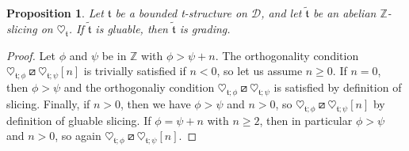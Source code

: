 \documentclass{article}
\newtheorem{prop}[thm]{Proposition}
\newtheorem{lem}[thm]{Lemma}
\theoremstyle{definition}
\newcommand{\Z}{\mathbb{Z}}
\newcommand{\tee}{\mathfrak{t}}
\newcommand{\orth}{\boxslash}
\begin{document}
\begin{prop}\label{glue-to-grad}
Let $\mathfrak{t}$ be a bounded t-structure on $\mathscr{D}$, and let $\tilde{\tee}$ be an abelian $\mathbb{Z}$-slicing on $\heartsuit_{\mathfrak{t}}$. If $\tilde{\tee}$ is gluable, then $\tilde{\tee}$ is grading.
\end{prop}
\begin{proof}
Let $\phi$ and $\psi$ be in $\Z$ with $\phi>\psi+n$.
The orthogonality condition $\heartsuit_{\tee;\phi}\orth\heartsuit_{\tee;\psi}[n]$ is trivially satisfied if $n<0$, so let us assume $n\geq 0$. If $n=0$, then $\phi>\psi$ and the orthogonaliy condition $\heartsuit_{\tee;\phi}\orth\heartsuit_{\tee;\psi}$ is satisfied by definition of slicing. Finally, if $n>0$, then we have $\phi>\psi$ and $n>0$, so $\heartsuit_{\tee;\phi}\orth\heartsuit_{\tee;\psi}[n]$ by definition of gluable slicing. %
If $\phi=\psi+n$ with $n\geq 2$, then in particular $\phi>\psi$ and $n>0$, so again $\heartsuit_{\tee;\phi}\orth\heartsuit_{\tee;\psi}[n]$. 
\end{proof}

\end{document}
